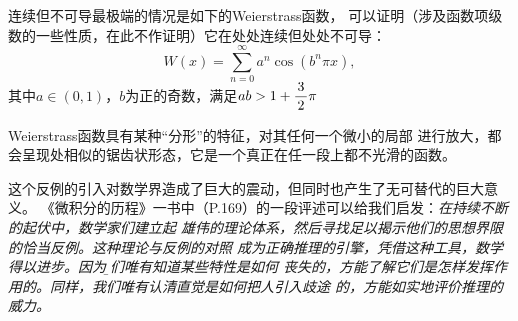 \begin{shaded}
	连续但不可导最极端的情况是如下的{\kaishu Weierstrass函数}，
	可以证明（涉及函数项级数的一些性质，在此不作证明）它在处处连续但处处不可导：	
	$$W(x)=\sum\limits_{n=0}^{\infty}a^n\cos(b^n\pi x),$$
	其中$a\in(0,1)$，$b$为正的奇数，满足$ab>1+\displaystyle\frac{\,{3}\,}{\,{2}\,}\pi$
	\begin{center}
		
		\kaishu Weierstrass函数具有某种“分形”的特征，对其任何一个微小的局部
		进行放大，都会呈现处相似的锯齿状形态，它是一个真正在任一段上都不光滑的函数。
	\end{center}
	
	这个反例的引入对数学界造成了巨大的震动，但同时也产生了无可替代的巨大意义。
	《微积分的历程》一书中（P.169）的一段评述可以给我们启发：{\it 在持续不断的起伏中，数学家们建立起
	雄伟的理论体系，然后寻找足以揭示他们的思想界限的恰当反例。这种理论与反例的对照
	成为正确推理的引擎，凭借这种工具，数学得以进步。因为{\b 我们唯有知道某些特性是如何
	丧失的，方能了解它们是怎样发挥作用的。同样，我们唯有认清直觉是如何把人引入歧途
	的，方能如实地评价推理的威力。}}
\end{shaded}

